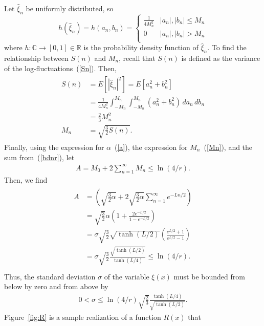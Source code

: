 Let $\hat{\xi}_n$ be uniformly distributed, so 
\begin{equation}\label{eq:square}
   h(\hat{\xi}_n) =h(a_n,b_n)= \left\{
     \begin{array}{lr}
       \frac{1}{4 M_n^2} & |a_n|,|b_n| \leq M_n\\
       0 & |a_n|,|b_n| > M_n\\
     \end{array}
   \right.
\end{equation} 
where $h:\mathbb{C}\to [0,1]\in \mathbb{R}$ is the probability density
function of $\hat{\xi}_n$. To find the relationship between $S(n)$ and
$M_n$, recall that $S(n)$ is defined as the variance of the
log-fluctuations~(\ref{Sn}). Then, 
\begin{align}
\begin{split}\label{Mn}
S(n)&=E[|\hat{\xi}_n|^2] = E[a_n^2+b_n^2]\\
 &= \frac{1}{4M_n^2}\int_{-M_n}^{M_n}\int_{-M_n}^{M_n}(a_n^2+b_n^2)\,da_n\,db_n\\
&=\frac{2}{3}M_n^2\\
M_n&=\sqrt{\frac{3}{2}S(n)}.
\end{split}
\end{align}
Finally, using the expression for $\alpha$~(\ref{a}), the
expression for $M_n$~(\ref{Mn}), and the sum from~(\ref{bdnr}), let
\begin{align*}
A = M_0+2\sum_{n=1}^\infty M_n \leq \ln(4/r).
\end{align*}
Then, we find
\begin{align*}
\begin{split}
A &=\left(\sqrt{\frac{3}{2}\alpha} +
2\sqrt{\frac{3}{2}\alpha}\sum_{n=1}^{\infty}e^{-Ln/2}\right) \\
&= \sqrt{\frac{3}{2}}\alpha\left(1+ \frac{2e^{-L/2}}{1-e^{-L/2}} \right)\\
&= \sigma\sqrt{\frac{3}{2}}
\sqrt{\tanh(L/2)}\left(\frac{e^{L/2}+1}{e^{L/2}-1} \right)\\
&= \sigma \sqrt{\frac{3}{2}}\frac{\sqrt{\tanh(L/2)}}{\tanh(L/4)} \leq \ln(4/r).\\
\end{split}
\end{align*}
Thus, the standard deviation $\sigma$ of the variable $\xi(x)$ must be bounded from below by
zero and from above by
\begin{align}\label{sigma}
0<\sigma \leq \ln(4/r)\sqrt{\frac{2}{3}}\frac{\tanh(L/4)}{\sqrt{\tanh(L/2)}}.
\end{align}
Figure~\ref{fig:R} is a sample realization of a function $R(x)$ that
